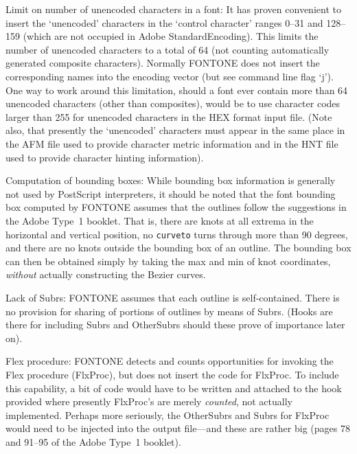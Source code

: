 \bpar Limit on number of unencoded characters in a font:
It has proven convenient to insert the `unencoded'
characters in the `control character' ranges 0--31 and 128--159
(which are not occupied in Adobe StandardEncoding).
This limits the number of unencoded characters to a total of 64 
(not counting automatically generated composite characters).
Normally FONTONE does not insert the corresponding names into the
encoding vector (but see command line flag `j').
One way to work around this limitation, should a font ever contain more
than 64 unencoded characters (other than composites),
would be to use character codes larger than 255 for unencoded
characters in the HEX format input file.
(Note also, that presently the `unencoded' characters must appear in the
same place in the AFM file used to provide character metric information
and in the HNT file used to provide character hinting information).

\bpar Computation of bounding boxes:
While bounding box information is
generally not used by PostScript interpreters, it should be noted
that the font bounding box computed by FONTONE assumes that the
outlines follow the suggestions in the Adobe Type~1 booklet.
That is, there are knots at all extrema in the horizontal and vertical
position, no  {\tt curveto} turns through more than 90 degrees, and
there are no knots outside the bounding box of an outline.
The bounding box can then be obtained simply by taking the max and
min of knot coordinates, {\it without} actually constructing the Bezier
curves. 


\bpar Lack of Subrs:
FONTONE assumes that each outline is self-contained.
There is no provision for sharing of portions of outlines by means of Subrs.
(Hooks are there for including Subrs and OtherSubrs should these prove
of importance later on). 

\bpar Flex procedure:
FONTONE detects and counts opportunities for invoking the Flex
procedure (FlxProc), but does not insert the code for FlxProc.  
To include this capability, a bit of code would have to be written and
attached to the hook provided where presently FlxProc's are merely
{\it counted}, not actually implemented.   
Perhaps more seriously, the OtherSubrs and Subrs for FlxProc would need
to be injected into the output file---and these are rather big 
(pages 78 and 91--95 of the Adobe Type~1 booklet).

